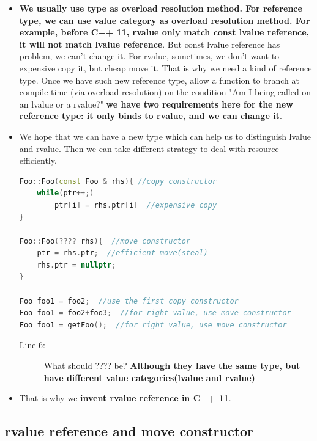 \documentclass[a4paper,11pt,twoside]{book}
\begin{document}
\begin{itemize}
	\item \textbf{We usually use type as overload resolution method. For reference type, we can use value category as overload resolution method. For example, before C++ 11, rvalue only match const lvalue reference, it will not match lvalue reference}. But const lvalue reference has problem, we can't change it. For rvalue, sometimes, we don't want to expensive copy it, but cheap move it. That is why we need a kind of reference type. Once we have such new reference type,  allow a function to branch at compile time (via overload resolution) on the condition "Am I being called on an lvalue or a rvalue?" \textbf{ we have two requirements here for the new reference type: it only binds to rvalue, and we can change it}.
			
	\item We hope that we can have a new type which can help us to distinguish lvalue and rvalue. Then we can take different strategy to deal with resource efficiently.

\begin{lstlisting}[frame=single, language=c++]
Foo::Foo(const Foo & rhs){ //copy constructor
	while(ptr++;)
	    ptr[i] = rhs.ptr[i]  //expensive copy
}	

Foo::Foo(???? rhs){  //move constructor
	ptr = rhs.ptr;  //efficient move(steal)
	rhs.ptr = nullptr;
}	
	
Foo foo1 = foo2;  //use the first copy constructor
Foo foo1 = foo2+foo3;  //for right value, use move constructor
Foo foo1 = getFoo();  //for right value, use move constructor
\end{lstlisting}

\begin{description}
	\item [Line 6:]What should ???? be? \textbf{Although they have the same type, but have different value categories(lvalue and rvalue)}
\end{description}
    \item That is why we \textbf{invent rvalue reference in C++ 11}. 
\end{itemize}

\subsection{ rvalue reference and move constructor}
\end{document}
